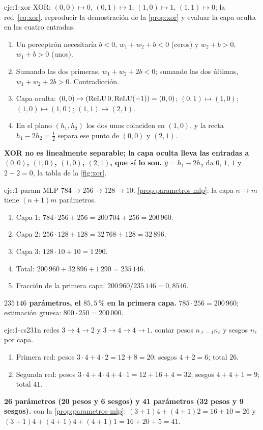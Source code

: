 \begin{solucion}{eje:1-xor}
\datos XOR: $(0,0)\mapsto 0$, $(0,1)\mapsto 1$, $(1,0)\mapsto 1$, $(1,1)\mapsto 0$; la red~\eqref{eq:xor}.
\planteamiento reproducir la demostración de la \cref{prop:xor} y evaluar la capa oculta en las cuatro entradas.
\pasos
\begin{enumerate}[label=\arabic*.]
  \item Un perceptrón necesitaría $b<0$, $w_1+w_2+b<0$ (ceros) y $w_2+b>0$, $w_1+b>0$ (unos).
  \item Sumando las dos primeras, $w_1+w_2+2b<0$; sumando las dos últimas, $w_1+w_2+2b>0$. Contradicción.
  \item Capa oculta: $(0,0)\mapsto(\operatorname{ReLU} 0,\operatorname{ReLU}(-1))=(0,0)$; $(0,1)\mapsto(1,0)$; $(1,0)\mapsto(1,0)$; $(1,1)\mapsto(2,1)$.
  \item En el plano $(h_1,h_2)$ los dos unos coinciden en $(1,0)$, y la recta $h_1-2h_2=\tfrac12$ separa ese punto de $(0,0)$ y $(2,1)$.
\end{enumerate}
\resultado \textbf{XOR no es linealmente separable; la capa oculta lleva las entradas a $(0,0)$, $(1,0)$, $(1,0)$, $(2,1)$, que sí lo son.}
\comprobacion $\hat y=h_1-2h_2$ da $0$, $1$, $1$ y $2-2=0$, la tabla de la \cref{fig:xor}.
\end{solucion}

\begin{solucion}{eje:1-param}
\datos MLP $784\to 256\to 128\to 10$.
\planteamiento \cref{prop:parametros-mlp}: la capa $n\to m$ tiene $(n+1)m$ parámetros.
\pasos
\begin{enumerate}[label=\arabic*.]
  \item Capa 1: $784\cdot 256+256=200\,704+256=200\,960$.
  \item Capa 2: $256\cdot 128+128=32\,768+128=32\,896$.
  \item Capa 3: $128\cdot 10+10=1\,290$.
  \item Total: $200\,960+32\,896+1\,290=235\,146$.
  \item Fracción de la primera capa: $200\,960/235\,146=0{,}8546$.
\end{enumerate}
\resultado \textbf{$235\,146$ parámetros, el $85{,}5\,\%$ en la primera capa.}
\comprobacion $785\cdot 256=200\,960$; estimación gruesa: $800\cdot 250=200\,000$.
\end{solucion}

\begin{solucion}{eje:1-cs231n}
\datos redes $3\to 4\to 2$ y $3\to 4\to 4\to 1$.
\planteamiento contar pesos $n_{\ell-1}n_\ell$ y sesgos $n_\ell$ por capa.
\pasos
\begin{enumerate}[label=\arabic*.]
  \item Primera red: pesos $3\cdot 4+4\cdot 2=12+8=20$; sesgos $4+2=6$; total $26$.
  \item Segunda red: pesos $3\cdot 4+4\cdot 4+4\cdot 1=12+16+4=32$; sesgos $4+4+1=9$; total $41$.
\end{enumerate}
\resultado \textbf{26 parámetros (20 pesos y 6 sesgos) y 41 parámetros (32 pesos y 9 sesgos).}
\comprobacion con la \cref{prop:parametros-mlp}: $(3+1)4+(4+1)2=16+10=26$ y $(3+1)4+(4+1)4+(4+1)1=16+20+5=41$.
\end{solucion}


